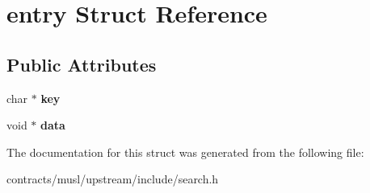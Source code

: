 \hypertarget{structentry}{}\section{entry Struct Reference}
\label{structentry}
\subsection*{Public Attributes}
\begin{DoxyCompactItemize}
\item 
\mbox{\label{structentry_a90fad543c99ac664b9ed3cfe1a6d3a13}} 
char $\ast$ {\bfseries key}
\item 
\mbox{\label{structentry_ab28607f8560a9533b09effb5bdb99f5e}} 
void $\ast$ {\bfseries data}
\end{DoxyCompactItemize}


The documentation for this struct was generated from the following file\+:\begin{DoxyCompactItemize}
\item 
contracts/musl/upstream/include/search.\+h\end{DoxyCompactItemize}
